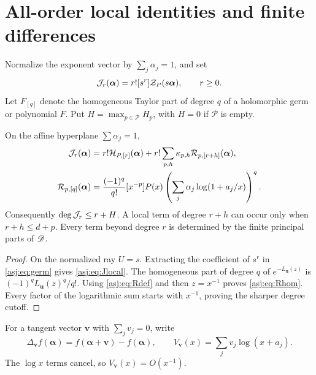 \section{All-order local identities and finite differences}
\label{asj:sec:local}

Normalize the exponent vector by $\sum_j\alpha_j=1$, and set
\begin{equation}\label{asj:eq:Jnormalized}
 \mathcal J_r(\boldsymbol\alpha)
  =r![s^r]\mathcal Z_P(s\boldsymbol\alpha),\qquad r\ge0.
\end{equation}
Let $F_{[q]}$ denote the homogeneous Taylor part of degree $q$ of a
holomorphic germ or polynomial $F$. Put
$H=\max_{p\in\mathcal P}H_p$, with $H=0$ if $\mathcal P$ is empty.

\begin{theorem}
\label{asj:thm:polynomial}
On the affine hyperplane $\sum\alpha_j=1$,
\begin{align}
 \mathcal J_r(\boldsymbol\alpha)
  &=r!\mathcal H_{P,[r]}(\boldsymbol\alpha)
      +r!\sum_{p,h}\kappa_{p,h}
                       \mathcal R_{p,[r+h]}(\boldsymbol\alpha),\label{asj:eq:Jlocal}\\
 \mathcal R_{p,[q]}(\boldsymbol\alpha)
  &=\frac{(-1)^q}{q!}[x^{-p}]P(x)
       \left(\sum_j\alpha_j\log(1+a_j/x)\right)^q.
 \label{asj:eq:Rhom}
\end{align}
Consequently $\deg\mathcal J_r\le r+H$. A local term of degree $r+h$ can
occur only when $r+h\le d+p$. Every term beyond degree $r$ is determined
by the finite principal parts of $\mathscr D$.
\end{theorem}
\begin{proof}
On the normalized ray $U=s$. Extracting the coefficient of $s^r$ in
\eqref{asj:eq:germ} gives \eqref{asj:eq:Jlocal}. The homogeneous part of degree
$q$ of $e^{-L_{\boldsymbol u}(z)}$ is
$(-1)^qL_{\boldsymbol u}(z)^q/q!$. Using \eqref{asj:eq:Rdef} and then
$z=x^{-1}$ proves \eqref{asj:eq:Rhom}. Every factor of the logarithmic
sum starts with $x^{-1}$, proving the sharper degree cutoff.
\end{proof}

For a tangent vector $\boldsymbol v$ with $\sum_jv_j=0$, write
\[
 \Delta_{\boldsymbol v}f(\boldsymbol\alpha)
     =f(\boldsymbol\alpha+\boldsymbol v)-f(\boldsymbol\alpha),
 \qquad V_{\boldsymbol v}(x)=\sum_jv_j\log(x+a_j).
\]
The $\log x$ terms cancel, so $V_{\boldsymbol v}(x)=O(x^{-1})$.

